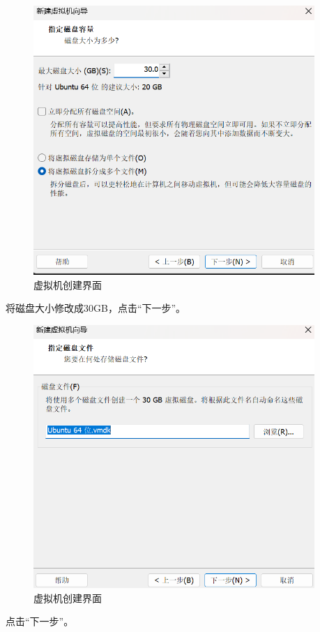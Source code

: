 \documentclass[UTF8]{ctexart}
\begin{document}
\begin{figure}[H]
    \centering
    \includegraphics[width=0.95\textwidth]{picture/Screenshot 2024-10-14 113546.png}
    \caption{虚拟机创建界面}
\end{figure}
将磁盘大小修改成30GB，点击“下一步”。

\begin{figure}[H]
    \centering
    \includegraphics[width=0.95\textwidth]{picture/Screenshot 2024-10-14 113657.png}
    \caption{虚拟机创建界面}
\end{figure}
点击“下一步”。
\end{document}
